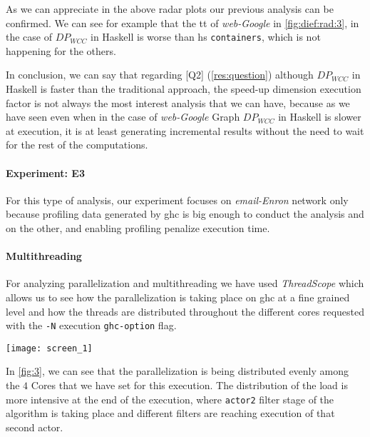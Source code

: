 As we can appreciate in the above radar plots our previous analysis can be confirmed. We can see for example that the \acrlong{tt} of \emph{web-Google} in \autoref{fig:dief:rad:3}, in the case of $DP_{WCC}$ in Haskell is worse than \acrshort{hs} \texttt{containers}, which is not happening for the others.

In conclusion, we can say that regarding [Q2] (\autoref{res:question}) although $DP_{WCC}$ in Haskell is faster than the traditional approach, the speed-up dimension execution factor is not always the most interest analysis that we can have, because as we have seen even when in the case of \emph{web-Google} Graph $DP_{WCC}$ in Haskell is slower at execution, it is at least generating incremental results without the need to wait for the rest of the computations.

\paragraph{Experiment: E3}
For this type of analysis, our experiment focuses on \emph{email-Enron} network \cite{netenron} only because profiling data generated by \acrshort{ghc} is big enough to conduct the analysis and on the other, and enabling profiling penalize execution time.

\paragraph{Multithreading} For analyzing parallelization and multithreading we have used \textit{ThreadScope} \cite{threadscope} which allows us to see how the parallelization is taking place on \acrshort{ghc} at a fine grained level and how the threads are distributed throughout the different cores requested with the \texttt{-N} execution \texttt{ghc-option} flag.

\begin{minipage}[t!]{\linewidth}

  \texttt{[image: screen\_1]}
  \captionsetup{type=figure}
  \label{fig:3}
\end{minipage}

In \autoref{fig:3}, we can see that the parallelization is being distributed evenly among the $4$ Cores that we have set for this execution.
The distribution of the load is more intensive at the end of the execution, where \texttt{actor2} filter stage 
of the algorithm is taking place and different filters are reaching execution of that second actor.

